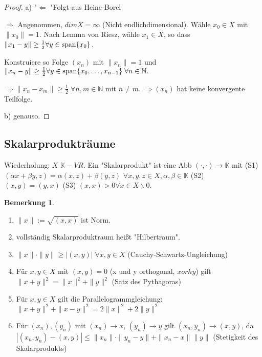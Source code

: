 \documentclass[ngerman]{report}
\theoremstyle{plain}%
\theoremstyle{definition}%
\theoremstyle{myStyle}
\newtheorem{bem}[thm]{Bemerkung}
\newcommand{\N}{\mathbb{N}}
\newcommand{\K}{\mathbb{K}}
\newcommand{\aufspan}{\textnormal{span}}
\newcommand{\norm}[1]{\|#1\|}
\newcommand{\df}[1][]{%
	\overset{#1}{\Rightarrow}
}
\newcommand{\qmarks}[1]{"{}#1"{}}
\newcommand{\afs}{"{}}
\begin{document}
	\begin{proof}
		a) \afs $\Leftarrow$ \afs Folgt aus Heine-Borel\par
		 \par
		$\Rightarrow$ Angenommen, $dim X = \infty$ (Nicht endlichdimensional). Wähle $x_0 \in X$ mit $\norm{x_0} = 1$. Nach Lemma von Riesz, wähle $x_1 \in X$, so dass $\norm{x_1 - y} \geq \frac{1}{2} \forall y \in \aufspan\{x_0\}$. \par
		Konstruiere so Folge $(x_n)$ mit $\norm{x_n} = 1$ und $\norm{x_n - y} \geq \frac{1}{2} \forall y\in \aufspan\{x_0,\dots,x_{n-1}\}\; \forall n\in\N.$ \par
		$\df \norm{x_n - x_m} \geq \frac{1}{2}\; \forall n,m \in \N$  mit $n \not = m$. 
		$\df (x_n)$ hat keine konvergente Teilfolge. \par
		b) genauso.
	\end{proof}

	\subsection{Skalarprodukträume}

	Wiederholung: $X$ $\K-VR$. Ein \qmarks{Skalarprodukt} ist eine Abb $(\cdot,\cdot) \to \K$ mit (S1) $(\alpha x + \beta y, z) = \alpha (x,z) + \beta (y,z)$ $\forall x,y,z \in X, \alpha,\beta \in \K$
	(S2) $(x,y) = (y,x)$
	(S3) $(x,x) > 0 \forall x\in X\backslash{0}$.

	\begin{bem}
		\begin{enumerate}
			\item $\norm{x} := \sqrt{(x,x)}$ ist Norm.
			\item vollständig Skalarproduktraum heißt \qmarks{Hilbertraum}.
			\item $\norm{x} \cdot \norm{y} \geq |(x,y)| \; \forall x,y \in X$ (Cauchy-Schwartz-Ungleichung)
			\item Für $x,y \in X$ mit $(x,y) = 0$ (x und y orthogonal, $x orh y$)
			gilt $\norm{x + y}^2 = \norm{x}^2 + \norm{y}^2$ (Satz des Pythagoras)
			\item Für $x,y \in X$ gilt die Parallelogrammgleichung: 
				$\norm{x + y} ^2 + \norm{x - y}^2 = 2 \norm{x}^2 + 2\norm{y}^2$
			\item	Für $(x_n), (y_n)$ mit $(x_n) \to x$, $(y_n) \to y$ gilt 
				$(x_n, y_n) \to (x,y)$, da $|(x_n, y_n) - (x,y)| \leq \norm{x_n}\cdot \norm{y_n - y} + \norm{x_n - x}\norm{y}$ (Stetigkeit des Skalarprodukts)
		\end{enumerate}
	\end{bem}
\end{document}
